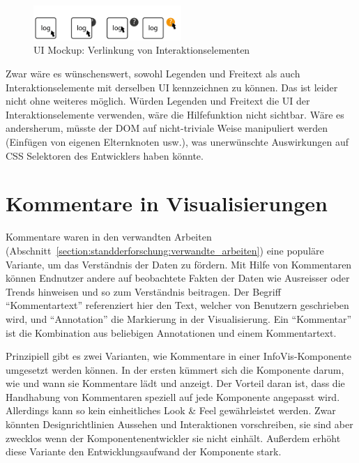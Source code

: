 \documentclass[
	headsepline,
	footsepline,
	fontsize=12pt,
	bibliography=totoc
]{scrbook}
\begin{document}
\begin{figure}[htbp]
   \centering
   \includegraphics[width=0.5\textwidth]{images/konzeption-verlinkung-bedienung.png}
   \caption{UI Mockup: Verlinkung von Interaktionselementen}
   \label{figure:verlinkung-bedienung}
\end{figure}

Zwar wäre es wünschenswert, sowohl Legenden und Freitext als auch Interaktionselemente mit derselben UI kennzeichnen zu können. Das ist leider nicht ohne weiteres möglich. Würden Legenden und Freitext die UI der Interaktionselemente verwenden, wäre die Hilfefunktion nicht sichtbar. Wäre es andersherum, müsste der DOM auf nicht-triviale Weise manipuliert werden (Einfügen von eigenen Elternknoten usw.), was unerwünschte Auswirkungen auf CSS Selektoren des Entwicklers haben könnte.

\section{Kommentare in Visualisierungen}
\label{section:konzeption:kommentare}


Kommentare waren in den verwandten Arbeiten (Abschnitt~\ref{section:standderforschung:verwandte_arbeiten}) eine populäre Variante, um das Verständnis der Daten zu fördern. Mit Hilfe von Kommentaren können Endnutzer andere auf beobachtete Fakten der Daten wie Ausreisser oder Trends hinweisen und so zum Verständnis beitragen. Der Begriff \enquote{Kommentartext} referenziert hier den Text, welcher von Benutzern geschrieben wird, und \enquote{Annotation} die Markierung in der Visualisierung. Ein \enquote{Kommentar} ist die Kombination aus beliebigen Annotationen und einem Kommentartext.


Prinzipiell gibt es zwei Varianten, wie Kommentare in einer InfoVis-Komponente umgesetzt werden können. In der ersten kümmert sich die Komponente darum, wie und wann sie Kommentare lädt und anzeigt. Der Vorteil daran ist, dass die Handhabung von Kommentaren speziell auf jede Komponente angepasst wird. Allerdings kann so kein einheitliches Look \& Feel gewährleistet werden. Zwar könnten Designrichtlinien Aussehen und Interaktionen vorschreiben, sie sind aber zwecklos wenn der Komponentenentwickler sie nicht einhält. Außerdem erhöht diese Variante den Entwicklungsaufwand der Komponente stark.
\end{document}

